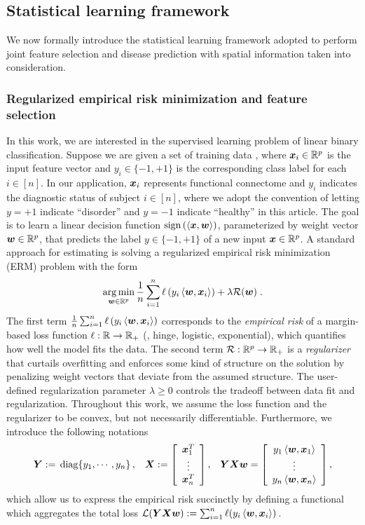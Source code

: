 \subsection{Statistical learning framework}
We now formally introduce the statistical learning framework adopted to perform joint feature selection and disease prediction with spatial information taken into consideration.

\subsubsection{Regularized empirical risk minimization and feature selection}
In this work, we are interested in the supervised learning problem of linear binary classification.
Suppose we are given a set of training data , where $\x_i\in\reals^p$ is the input feature vector and ${y_i\in\{-1,+1\}}$ is the corresponding class label for each $i\in[n]$.
In our application, $\x_i$ represents functional connectome and $y_i$ indicates the diagnostic status of subject $i\in[n]$, where we adopt the convention of letting $y=+1$ indicate ``disorder'' and $y=-1$ indicate ``healthy'' in this article.
The goal is to learn a linear decision function $\sign{\inprod{\x,\w}}$, parameterized by weight vector $\w\in\reals^p$, that predicts the label $y\in\{-1,+1\}$ of a new input $\x\in\reals^p$.
A standard approach for estimating \w is solving a regularized empirical risk minimization (ERM) problem with the form 
\begin{equation}
	\argmin{\w\in\reals^p} \frac{1}{n} \sum_{i=1}^n \loss\left(y_i \inprod{\w,\x_i}\right) + \lambda\Reg(\w) \;.
	\label{eqn:reg,erm}
\end{equation}
The first term $\frac{1}{n}\sum_{i=1}^n \loss\left(y_i \inprod{\w,\x_i}\right)$ corresponds to the \emph{empirical risk} of a margin-based loss function $\loss:\reals\to\reals_+$ (\eg, hinge, logistic, exponential), which quantifies how well the model fits the data.
The second term $\Reg:\reals^p\to\reals_+$ is a \emph{regularizer} that curtails overfitting and enforces some kind of structure on the solution by penalizing weight vectors that deviate from the assumed structure.
The user-defined regularization parameter $\lambda\geq0$ controls the tradeoff between data fit and regularization. 
Throughout this work, we assume the loss function and the regularizer to be convex, but not necessarily differentiable.
Furthermore, we introduce the following notations 
\[
	\begin{array}{ccc}
		\Y:=\diag{y_1,\cdots,y_n}			, &
		\X:=\ba{c} \x_1^T \\ \vdots \\ \x_n^T \ea , &
		\YXw=\ba{c} y_1 \inprod{\w,\x_1} \\ \vdots \\ y_n \inprod{\w,\x_n} \ea ,
	\end{array}
\]
which allow us to express the empirical risk succinctly by defining a functional  which aggregates the total loss ${\Loss(\YXw):=\sum_{i=1}^n \loss(y_i \inprod{\w,\x_i})}\,$.


